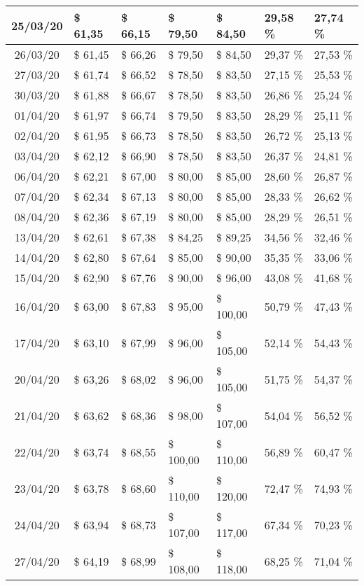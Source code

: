 \begin{center}
\begin{longtable}{|c|p{1.5cm}|p{1.5cm}|p{1.5cm}|p{1.5cm}|p{1.5cm}|p{1.5cm}|}
25/03/20 & \$ 61,35 & \$ 66,15 & \$ 79,50 & \$ 84,50 & 29,58 \% & 27,74 \% \\ \hline
26/03/20 & \$ 61,45 & \$ 66,26 & \$ 79,50 & \$ 84,50 & 29,37 \% & 27,53 \% \\ \hline
27/03/20 & \$ 61,74 & \$ 66,52 & \$ 78,50 & \$ 83,50 & 27,15 \% & 25,53 \% \\ \hline
30/03/20 & \$ 61,88 & \$ 66,67 & \$ 78,50 & \$ 83,50 & 26,86 \% & 25,24 \% \\ \hline
01/04/20 & \$ 61,97 & \$ 66,74 & \$ 79,50 & \$ 83,50 & 28,29 \% & 25,11 \% \\ \hline
02/04/20 & \$ 61,95 & \$ 66,73 & \$ 78,50 & \$ 83,50 & 26,72 \% & 25,13 \% \\ \hline
03/04/20 & \$ 62,12 & \$ 66,90 & \$ 78,50 & \$ 83,50 & 26,37 \% & 24,81 \% \\ \hline
06/04/20 & \$ 62,21 & \$ 67,00 & \$ 80,00 & \$ 85,00 & 28,60 \% & 26,87 \% \\ \hline
07/04/20 & \$ 62,34 & \$ 67,13 & \$ 80,00 & \$ 85,00 & 28,33 \% & 26,62 \% \\ \hline
08/04/20 & \$ 62,36 & \$ 67,19 & \$ 80,00 & \$ 85,00 & 28,29 \% & 26,51 \% \\ \hline
13/04/20 & \$ 62,61 & \$ 67,38 & \$ 84,25 & \$ 89,25 & 34,56 \% & 32,46 \% \\ \hline
14/04/20 & \$ 62,80 & \$ 67,64 & \$ 85,00 & \$ 90,00 & 35,35 \% & 33,06 \% \\ \hline
15/04/20 & \$ 62,90 & \$ 67,76 & \$ 90,00 & \$ 96,00 & 43,08 \% & 41,68 \% \\ \hline
16/04/20 & \$ 63,00 & \$ 67,83 & \$ 95,00 & \$ 100,00 & 50,79 \% & 47,43 \% \\ \hline
17/04/20 & \$ 63,10 & \$ 67,99 & \$ 96,00 & \$ 105,00 & 52,14 \% & 54,43 \% \\ \hline
20/04/20 & \$ 63,26 & \$ 68,02 & \$ 96,00 & \$ 105,00 & 51,75 \% & 54,37 \% \\ \hline
21/04/20 & \$ 63,62 & \$ 68,36 & \$ 98,00 & \$ 107,00 & 54,04 \% & 56,52 \% \\ \hline
22/04/20 & \$ 63,74 & \$ 68,55 & \$ 100,00 & \$ 110,00 & 56,89 \% & 60,47 \% \\ \hline
23/04/20 & \$ 63,78 & \$ 68,60 & \$ 110,00 & \$ 120,00 & 72,47 \% & 74,93 \% \\ \hline
24/04/20 & \$ 63,94 & \$ 68,73 & \$ 107,00 & \$ 117,00 & 67,34 \% & 70,23 \% \\ \hline
27/04/20 & \$ 64,19 & \$ 68,99 & \$ 108,00 & \$ 118,00 & 68,25 \% & 71,04 \% \\ \hline

\end{longtable}
\end{center}
